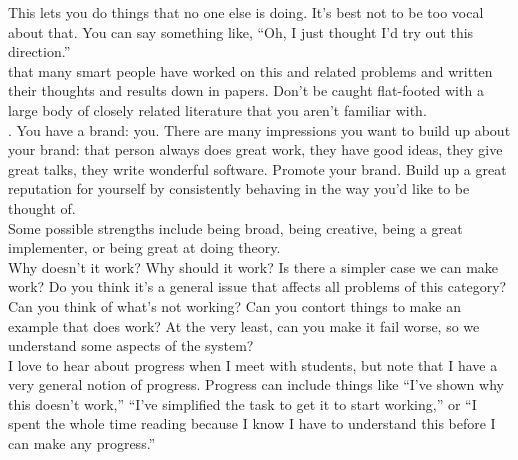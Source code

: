   This
lets you do things that no one else is doing.  It's
best not to be too vocal about that.  You can say something like,
``Oh, I just thought I'd try out this direction.'' \\

 that many smart people have
worked on this and related problems and written their thoughts and results
down in papers.  Don't be caught flat-footed with a large body of closely
related literature that you aren't familiar with.  \\

.   You have a brand:  you.  There are many impressions you want to build up about your brand:  that person always does great work, they have good
ideas, they give great talks, they write wonderful software.
Promote your brand.  Build up a great reputation for yourself by  consistently behaving in the way you'd like to be thought of.\\


  Some
possible strengths include  being broad, being creative, being  a great implementer, or being great at doing theory.  \\

  Why  doesn't it work?  Why should it work?   Is there a simpler case we  can make work?  Do you think it's a general issue that affects all
problems of this category?  Can you think of what's  not working?  Can you contort things
to make an example that does work?  At the very least, can you make it fail
worse, so we understand some aspects of the system?  \\

 I love to hear about progress when I meet with students, but  note that  I have a very general notion of
progress.  Progress can include things like ``I've shown why this doesn't work,'' ``I've
simplified the task to get it to start working,'' or ``I spent the
whole time reading because I know I have to understand this before I
can make any progress.'' \\

